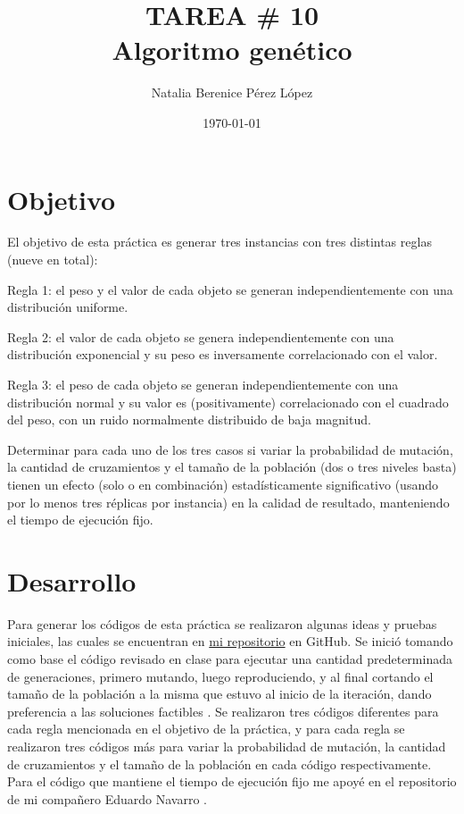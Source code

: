 \documentclass{article}
\title{TAREA \# 10 \\ Algoritmo genético} %
\author{Natalia Berenice P\'{e}rez L\'{o}pez} %
\date{\today}
\begin{document}

\maketitle %

\section{Objetivo}
El objetivo de esta práctica es generar tres instancias con tres distintas reglas (nueve en total):
\bigskip

Regla 1: el peso y el valor de cada objeto se generan independientemente con una distribución uniforme.
\smallskip

Regla 2: el valor de cada objeto se genera independientemente con una distribución exponencial y su peso es inversamente correlacionado con el valor.
\smallskip

Regla 3: el peso de cada objeto se generan independientemente con una distribución normal y su valor es (positivamente) correlacionado con el cuadrado del peso, con un ruido normalmente distribuido de baja magnitud.
\smallskip

Determinar para cada uno de los tres casos si variar la probabilidad de mutación, la cantidad de cruzamientos y el tamaño de la población (dos o tres niveles basta) tienen un efecto (solo o en combinación) estadísticamente significativo (usando por lo menos tres réplicas por instancia) en la calidad de resultado, manteniendo el tiempo de ejecución fijo.

\section{Desarrollo} %
Para generar los códigos de esta práctica se realizaron algunas ideas y pruebas iniciales, las cuales se encuentran en \href{https://github.com/nataliaperez0/Simulation/tree/main/Tarea10}{mi repositorio}  en GitHub. Se inició tomando como base el código revisado en clase para ejecutar una cantidad predeterminada de generaciones, primero mutando, luego reproduciendo, y al final cortando el tamaño de la población a la misma que estuvo al inicio de la iteración, dando preferencia a las soluciones factibles \citep{1}. Se realizaron tres códigos diferentes para cada regla mencionada en el objetivo de la práctica, y para cada regla se realizaron tres códigos más para variar la probabilidad de mutación, la cantidad de cruzamientos y el tamaño de la población en cada código respectivamente. Para el código que mantiene el tiempo de ejecución fijo me apoyé en el repositorio de mi compañero Eduardo Navarro \citep{2}.
\bigskip
\end{document}
